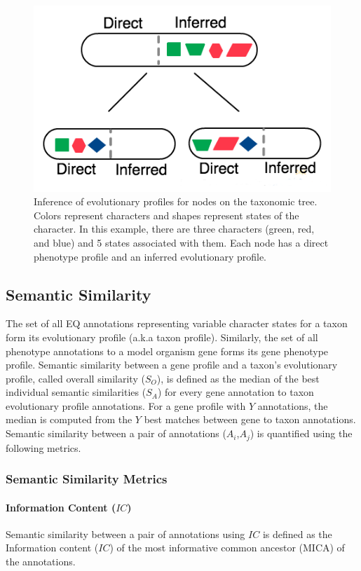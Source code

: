\documentclass{article}
\begin{document}
\begin{figure}
\centering
\includegraphics[width=1\textwidth]{ACM-Fitch.png}
\caption{\label{fitch} Inference of evolutionary profiles for nodes on the taxonomic tree. Colors represent characters and shapes represent states of the character. In this example, there are three characters (green, red, and blue) and 5 states associated with them. Each node has a direct phenotype profile and an inferred evolutionary profile.}
\end{figure}

\subsection{Semantic Similarity}
The set of all EQ annotations representing variable character states for a taxon form its evolutionary profile (a.k.a taxon profile). Similarly, the set of all phenotype annotations to a model organism gene forms its gene phenotype profile. Semantic similarity between a gene profile and a taxon's evolutionary profile, called overall similarity ($S_O$), is defined as the median of the best individual semantic similarities ($S_A$) for every gene annotation to taxon evolutionary profile annotations. For a gene profile with $Y$ annotations, the median is computed from the $Y$ best matches between gene to taxon annotations. Semantic similarity between a pair of annotations ($A_i$,$A_j$) is quantified using the following metrics. 

\subsubsection{Semantic Similarity Metrics}
\paragraph{Information Content ($IC$)}
Semantic similarity between a pair of annotations using $IC$ is defined as the Information content ($IC$) of the most informative common ancestor (MICA) of the annotations. 
\end{document}
